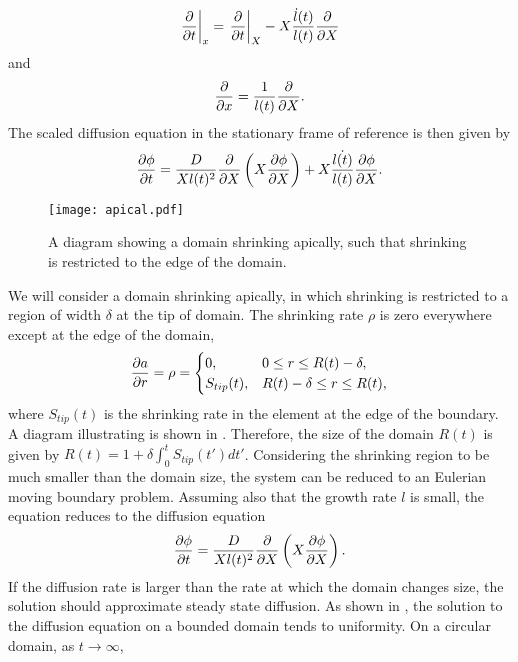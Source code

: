 %
\begin{equation}
\left.\frac{\partial }{\partial t}\right|_{x} = \left.\frac{\partial }{\partial t}\right|_{X} - X \frac{\dot{l}(t)}{l(t)} \frac{\partial }{\partial X}
\end{equation}
%
and
%
\begin{equation}
\frac{\partial }{\partial x} = \frac{1}{l(t)}\frac{\partial }{\partial X}.
\end{equation}
%
The scaled diffusion equation in the stationary frame of reference is then given by
%
\begin{equation}
\frac{\partial \phi}{\partial t} = \frac{D}{Xl(t)^2}\frac{\partial }{\partial X}\left(X \frac{\partial \phi}{\partial X} \right) + X \frac{\dot{l(t)}}{l(t)}\frac{\partial \phi}{\partial X}.
\end{equation}
%
\begin{figure} [h]
    \centering
        \texttt{[image: apical.pdf]}
        \caption{A diagram showing a domain shrinking apically, such that shrinking is restricted to the edge of the domain.}
    \label{fig:apical_diagram}
\end{figure}
%
We will consider a domain shrinking apically, in which shrinking is restricted to a region of width $\delta$ at the tip of domain. The shrinking rate $\rho$ is zero everywhere except at the edge of the domain,
%
\begin{equation}
\frac{\partial a}{\partial r} = \rho = \begin{cases}
		0, & 0 \leq r \leq R(t) - \delta, \\
		S_{tip}(t), & R(t) - \delta \leq r \leq R(t), \\
		\end{cases}
        \label{eqn:s_tip}
\end{equation}
%
where $S_{tip}(t)$ is the shrinking rate in the element at the edge of the boundary. A diagram illustrating  is shown in . Therefore, the size of the domain $R(t)$ is given by $R(t) = 1 + \delta \int_0^t S_{tip}(t')dt'$. Considering the shrinking region to be much smaller than the domain size, the system can be reduced to an Eulerian moving boundary problem.
Assuming also that the growth rate $l$ is small, the equation reduces to the diffusion equation
%
\begin{equation}
\frac{\partial \phi}{\partial t} = \frac{D}{Xl(t)^2}\frac{\partial }{\partial X}\left(X \frac{\partial \phi}{\partial X} \right).
\end{equation}
%
If the diffusion rate is larger than the rate at which
 the domain changes size, the solution should approximate steady state diffusion. As shown in , the solution to the diffusion equation on a bounded domain tends to uniformity. On a circular domain, as $t\rightarrow \infty$,
